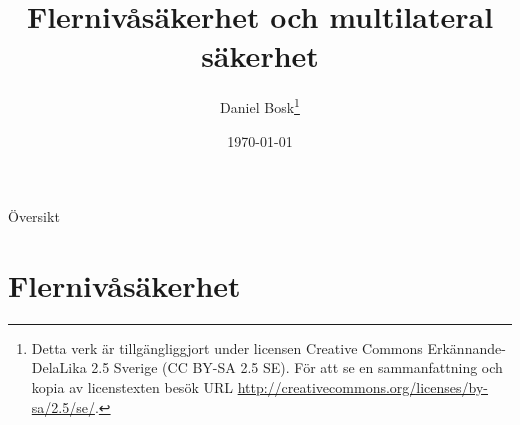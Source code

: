 \documentclass{beamer}
\title{%
  Flernivåsäkerhet och multilateral säkerhet
}
\author{Daniel Bosk\footnote{%
  Detta verk är tillgängliggjort under licensen Creative Commons 
  Erkännande-DelaLika 2.5 Sverige (CC BY-SA 2.5 SE).
	För att se en sammanfattning och kopia av licenstexten besök URL 
	\url{http://creativecommons.org/licenses/by-sa/2.5/se/}.
}}
\institute[MIUN IKS]{%
  Avdelningen för informations- och kommunikationssytem (IKS),\\
  Mittuniversitetet, Sundsvall.
}
\date{\today}
\begin{document}
\begin{frame}
  \titlepage
\end{frame}

\begin{frame}{Översikt}
  \tableofcontents
\end{frame}





\section{Flernivåsäkerhet}
\end{document}
